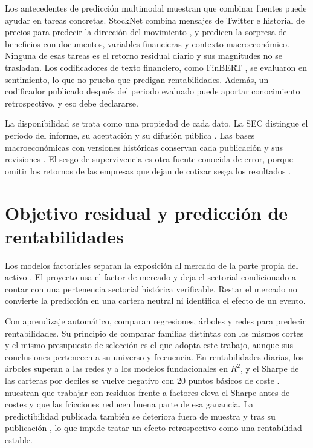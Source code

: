 \documentclass[11pt,a4paper]{report}
\begin{document}
Los antecedentes de predicción multimodal muestran que combinar fuentes puede
ayudar en tareas concretas. StockNet combina mensajes de Twitter e historial de
precios para predecir la dirección del movimiento \parencite{xu2018stocknet},
y \textcite{koval2024financial} predicen la sorpresa de beneficios con
documentos, variables financieras y contexto macroeconómico. Ninguna de esas
tareas es el retorno residual diario y sus magnitudes no se trasladan. Los
codificadores de texto financiero, como FinBERT \parencite{araci2019finbert},
se evaluaron en sentimiento, lo que no prueba que predigan rentabilidades.
Además, un codificador publicado después del periodo evaluado puede aportar
conocimiento retrospectivo, y eso debe declararse.

La disponibilidad se trata como una propiedad de cada dato. La SEC distingue el
periodo del informe, su aceptación y su difusión pública
\parencite{sec_edgar_timestamps}. Las bases macroeconómicas con versiones
históricas conservan cada publicación y sus revisiones
\parencite{alfred_vintages,mccracken2016fredmd}. El sesgo de supervivencia es
otra fuente conocida de error, porque omitir los retornos de las empresas que
dejan de cotizar sesga los resultados \parencite{shumway1997delisting}.

\section{Objetivo residual y predicción de rentabilidades}
Los modelos factoriales separan la exposición al mercado de la parte propia
del activo \parencite{fama1993risk,fama2015five,cochrane2005asset}. El
proyecto usa el factor de mercado y deja el sectorial condicionado a contar
con una pertenencia sectorial histórica verificable. Restar el mercado no
convierte la predicción en una cartera neutral ni identifica el efecto de un
evento.

Con aprendizaje automático, \textcite{gu2020assetpricing} comparan
regresiones, árboles y redes para predecir rentabilidades. Su principio de
comparar familias distintas con los mismos cortes y el mismo presupuesto de
selección es el que adopta este trabajo, aunque sus conclusiones pertenecen a
su universo y frecuencia. En rentabilidades diarias, los árboles superan a las
redes y a los modelos fundacionales en $R^2$, y el Sharpe de las carteras por
deciles se vuelve negativo con 20 puntos básicos de coste
\parencite{rahimikia2025tsfmfinance}. \textcite{guijarro2026statarb}
muestran que trabajar con residuos frente a factores eleva el Sharpe antes de
costes y que las fricciones reducen buena parte de esa ganancia. La
predictibilidad publicada también se deteriora fuera de muestra y tras su
publicación \parencite{mclean2016predictability}, lo que impide tratar un
efecto retrospectivo como una rentabilidad estable.
\end{document}
